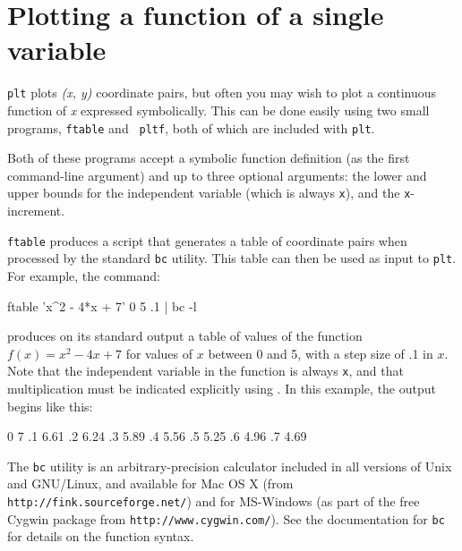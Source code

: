 \documentclass{book}
\begin{document}
\section{Plotting a function of a single variable}

%
{\tt plt} plots {\em (x, y)} coordinate pairs, but often you may wish
to plot a continuous function of {\em x} expressed symbolically.  This
can be done easily using two small programs, {\tt ftable} and {\tt
pltf}, both of which are included with {\tt plt}.

Both of these programs accept a symbolic function definition (as the
first command-line argument) and up to three optional arguments:
the lower and upper bounds for the independent variable (which is
always {\tt x}), and the {\tt x}-increment.

{\tt ftable} produces a script that generates a table of coordinate
pairs when processed by the standard {\tt bc} utility.  This table can
then be used as input to {\tt plt}.  For example, the command:

\begin{center}
\begin{boxedverbatim}
ftable 'x^2 - 4*x + 7' 0 5 .1 | bc -l
\end{boxedverbatim}
\end{center}

\noindent
produces on its standard output a table of values of the function
$f(x)=x^2-4x+7$ for values of $x$ between 0 and 5, with a step
size of .1 in $x$.  Note that the independent variable in the function
is always {\tt x}, and that multiplication must be indicated
explicitly using {\tt *}.  In this example, the output begins like this:

\begin{center}
\begin{boxedverbatim}
0 7
.1 6.61
.2 6.24
.3 5.89
.4 5.56
.5 5.25
.6 4.96
.7 4.69
\end{boxedverbatim}
\end{center}

%
%
%
%
%
%
%
The {\tt bc} utility is an arbitrary-precision calculator included in
all versions of Unix and GNU/Linux, and available for Mac OS X (from
{\tt http://fink\-.source\-forge\-.net/}) and for MS-Windows (as part
of the free Cygwin package from {\tt http://www\-.cyg\-win\-.com/}).
See the documentation for {\tt bc} for details on the function syntax.
\end{document}
